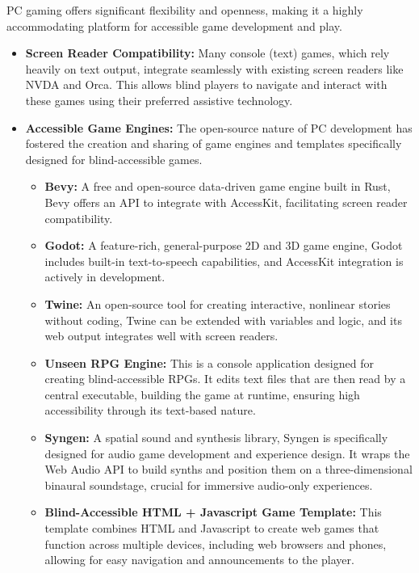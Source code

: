 PC gaming offers significant flexibility and openness, making it a highly accommodating platform for accessible game development and play.
\begin{itemize}
    \item \textbf{Screen Reader Compatibility:} Many console (text) games, which rely heavily on text output, integrate seamlessly with existing screen readers like NVDA and Orca\supercite{GitHubGameEngines}. This allows blind players to navigate and interact with these games using their preferred assistive technology.
    \item \textbf{Accessible Game Engines:} The open-source nature of PC development has fostered the creation and sharing of game engines and templates specifically designed for blind-accessible games\supercite{GitHubGameEngines}.
    \begin{itemize}
        \item \textbf{Bevy:} A free and open-source data-driven game engine built in Rust, Bevy offers an API to integrate with AccessKit, facilitating screen reader compatibility\supercite{GitHubGameEngines}.
        \item \textbf{Godot:} A feature-rich, general-purpose 2D and 3D game engine, Godot includes built-in text-to-speech capabilities, and AccessKit integration is actively in development\supercite{GitHubGameEngines}.
        \item \textbf{Twine:} An open-source tool for creating interactive, nonlinear stories without coding, Twine can be extended with variables and logic, and its web output integrates well with screen readers\supercite{GitHubGameEngines}.
        \item \textbf{Unseen RPG Engine:} This is a console application designed for creating blind-accessible RPGs. It edits text files that are then read by a central executable, building the game at runtime, ensuring high accessibility through its text-based nature\supercite{GitHubGameEngines}.
        \item \textbf{Syngen:} A spatial sound and synthesis library, Syngen is specifically designed for audio game development and experience design. It wraps the Web Audio API to build synths and position them on a three-dimensional binaural soundstage, crucial for immersive audio-only experiences\supercite{GitHubGameEngines}.
        \item \textbf{Blind-Accessible HTML + Javascript Game Template:} This template combines HTML and Javascript to create web games that function across multiple devices, including web browsers and phones, allowing for easy navigation and announcements to the player\supercite{GitHubGameEngines}.
    \end{itemize}
\end{itemize}

